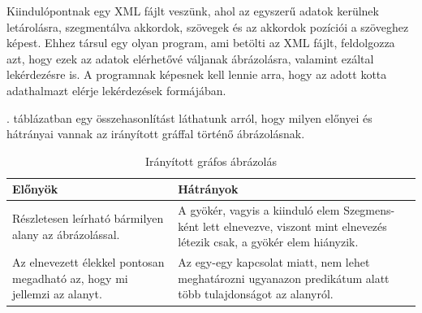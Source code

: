 
Kiindulópontnak egy XML fájlt veszünk, ahol az egyszerű adatok kerülnek letárolásra, szegmentálva akkordok, szövegek és az akkordok pozíciói a szöveghez képest. Ehhez társul egy olyan program, ami betölti az XML fájlt, feldolgozza azt, hogy ezek az adatok elérhetővé váljanak ábrázolásra, valamint ezáltal lekérdezésre is. A programnak képesnek kell lennie arra, hogy az adott kotta adathalmazt elérje lekérdezések formájában.




. táblázatban egy összehasonlítást láthatunk arról, hogy milyen előnyei és hátrányai vannak az irányított gráffal történő ábrázolásnak.

\begin{table}[h!]
\caption{Irányított gráfos ábrázolás}
\label{tab:dagcomp}
\begin{center}
	\begin{tabular}{ |p{7cm}|p{7cm}| }
		\hline
		Előnyök & Hátrányok\\
		\hline
		Részletesen leírható bármilyen alany az ábrázolással. & A gyökér, vagyis a kiinduló elem Szegmens-ként lett elnevezve, viszont mint elnevezés létezik csak, a gyökér elem hiányzik. \\ 
		\hline
		Az elnevezett élekkel pontosan megadható az, hogy mi jellemzi az alanyt. & Az egy-egy kapcsolat miatt, nem lehet meghatározni ugyanazon predikátum alatt több tulajdonságot az alanyról.\\
		\hline
	\end{tabular}
\end{center}
\end{table}


